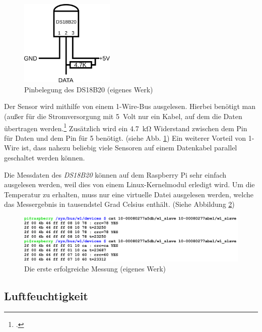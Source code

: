 \begin{figure}[h]
  \centering
     \includegraphics[width=0.4\textwidth]{figures/temp_pin.png}
  \caption{Pinbelegung des DS18B20 (eigenes Werk)}
  \label{fig:temp_pin}
\end{figure}

Der Sensor wird mithilfe von einem 1-Wire-Bus ausgelesen. Hierbei benötigt man (außer für die Stromversorgung mit \SI{5}{\gls{Volt}} nur ein Kabel, auf dem die Daten übertragen werden.\footcite{1-wire} Zusätzlich wird ein \SI{4.7}{\kilo\ohm} Widerstand zwischen dem Pin für Daten und dem Pin für \SI[retain-explicit-plus]{+5}{} benötigt. (siehe Abb. \ref{fig:temp_pin})
Ein weiterer Vorteil von 1-Wire ist, dass nahezu beliebig viele Sensoren auf einem Datenkabel parallel geschaltet werden können.

Die Messdaten des \emph{DS18B20} können auf dem Raspberry Pi sehr einfach ausgelesen werden, weil dies von einem Linux-\gls{Kernelmodul} erledigt wird. Um die Temperatur zu erhalten, muss  nur eine virtuelle Datei ausgelesen werden, welche das Messergebnis in tausendstel Grad Celsius enthält. (Siehe Abbildung \ref{fig:temp_screenshot})

\begin{figure}[h]
  \centering
     \includegraphics[width=\textwidth]{figures/temp_screenshot.png}
  \caption{Die erste erfolgreiche Messung (eigenes Werk)}
  \label{fig:temp_screenshot}
\end{figure}

\subsection{Luftfeuchtigkeit}
\label{subsec:Luftfeuchtigkeit}

